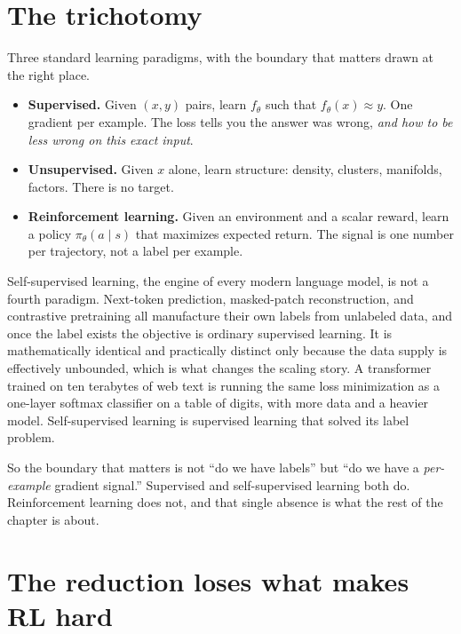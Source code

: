 
\section{The trichotomy}\label{sec:trichotomy}

Three standard learning paradigms, with the boundary that matters drawn at
the right place.

\begin{itemize}
\item \textbf{Supervised.} Given $(x, y)$ pairs, learn $f_\theta$ such that
$f_\theta(x) \approx y$. One gradient per example. The loss tells you the
answer was wrong, \emph{and how to be less wrong on this exact input}.
\item \textbf{Unsupervised.} Given $x$ alone, learn structure: density,
clusters, manifolds, factors. There is no target.
\item \textbf{Reinforcement learning.} Given an environment and a scalar
reward, learn a policy $\pi_\theta(a \mid s)$ that maximizes expected return.
The signal is one number per trajectory, not a label per example.
\end{itemize}

Self-supervised learning, the engine of every modern language model, is not
a fourth paradigm. Next-token prediction, masked-patch reconstruction, and
contrastive pretraining all manufacture their own labels from unlabeled
data, and once the label exists the objective is ordinary supervised
learning. It is mathematically identical and practically distinct only
because the data supply is effectively unbounded, which is what changes the
scaling story. A transformer trained on ten terabytes of web text is running
the same loss minimization as a one-layer softmax classifier on a table of
digits, with more data and a heavier model. Self-supervised learning is
supervised learning that solved its label problem.

So the boundary that matters is not ``do we have labels'' but ``do we have a
\emph{per-example} gradient signal.'' Supervised and self-supervised learning
both do. Reinforcement learning does not, and that single absence is what the
rest of the chapter is about.

\section{The reduction loses what makes RL hard}\label{sec:rl-reduction}

